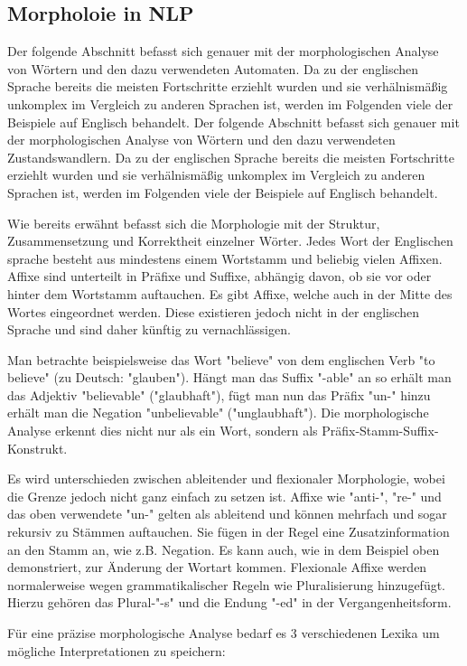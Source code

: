\documentclass[12pt]{article}
\begin{document}
\subsection{Morpholoie in NLP}

Der folgende Abschnitt befasst sich genauer mit der morphologischen Analyse von Wörtern und den dazu verwendeten Automaten. Da zu der englischen Sprache bereits die meisten Fortschritte erziehlt wurden und sie verhälnismäßig unkomplex im Vergleich zu anderen Sprachen ist, werden im Folgenden viele der Beispiele auf Englisch behandelt.
Der folgende Abschnitt befasst sich genauer mit der morphologischen Analyse von Wörtern und den dazu verwendeten Zustandswandlern. Da zu der englischen Sprache bereits die meisten Fortschritte erziehlt wurden und sie verhälnismäßig unkomplex im Vergleich zu anderen Sprachen ist, werden im Folgenden viele der Beispiele auf Englisch behandelt.

Wie bereits erwähnt befasst sich die Morphologie mit der Struktur, Zusammensetzung und Korrektheit einzelner Wörter. Jedes Wort der Englischen sprache besteht aus mindestens einem Wortstamm und beliebig vielen Affixen. Affixe sind unterteilt in Präfixe und Suffixe, abhängig davon, ob sie vor oder hinter dem Wortstamm auftauchen. Es gibt Affixe, welche auch in der Mitte des Wortes eingeordnet werden. Diese existieren jedoch nicht in der englischen Sprache und sind daher künftig zu vernachlässigen. 

Man betrachte beispielsweise das Wort "believe" von dem englischen Verb "to believe" (zu Deutsch: "glauben"). Hängt man das Suffix "-able" an so erhält man das Adjektiv "believable" ("glaubhaft"), fügt man nun das Präfix "un-" hinzu erhält man die Negation "unbelievable" ("unglaubhaft"). Die morphologische Analyse erkennt dies nicht nur als ein Wort, sondern als Präfix-Stamm-Suffix-Konstrukt.

Es wird unterschieden zwischen ableitender und flexionaler Morphologie, wobei die Grenze jedoch nicht ganz einfach zu setzen ist. Affixe wie "anti-", "re-" und das oben verwendete "un-" gelten als ableitend und können mehrfach und sogar rekursiv zu Stämmen auftauchen. Sie fügen in der Regel eine Zusatzinformation an den Stamm an, wie z.B. Negation. Es kann auch, wie in dem Beispiel oben demonstriert, zur Änderung der Wortart kommen. Flexionale Affixe werden normalerweise wegen grammatikalischer Regeln wie Pluralisierung hinzugefügt. Hierzu gehören das Plural-"-s" und die Endung "-ed" in der Vergangenheitsform. 

Für eine präzise morphologische Analyse bedarf es 3 verschiedenen Lexika um mögliche Interpretationen zu speichern:
\end{document}
